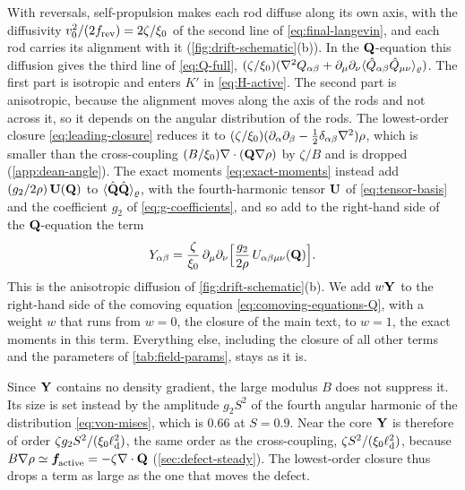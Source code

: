 \documentclass[aps,pre,reprint,superscriptaddress,longbibliography,nofootinbib
]{revtex4-2}
\begin{document}
With reversals, self-propulsion makes each rod diffuse
along its own axis, with the diffusivity
$v_0^2/(2f_{\rm rev})=2\zeta/\xi_0$ of the second line of
\cref{eq:final-langevin}, and each rod carries its
alignment with it (\cref{fig:drift-schematic}(b)). In the
$\mathbf{Q}$-equation this diffusion gives the third line of
\cref{eq:Q-full},
$(\zeta/\xi_0)(\nabla^2Q_{\alpha\beta}+\partial_\mu\partial_\nu\langle\hat
Q_{\alpha\beta}\hat Q_{\mu\nu}\rangle_\varrho)$. The first part is
isotropic and enters $K'$ in \cref{eq:H-active}. The second
part is anisotropic, because the alignment moves along the
axis of the rods and not across it, so it depends on the
angular distribution of the rods. The lowest-order closure
\cref{eq:leading-closure} reduces it to
$(\zeta/\xi_0)(\partial_\alpha\partial_\beta-\tfrac12\delta_{\alpha\beta}\nabla^2)\rho$,
which is smaller than the cross-coupling
$(B/\xi_0)\nabla\cdot(\mathbf{Q}\nabla\rho)$ by $\zeta/B$ and is
dropped (\cref{app:dean-angle}). The exact moments
\cref{eq:exact-moments} instead add $(g_2/2\rho)\,\mathbf{U}(\mathbf{Q})$
to $\langle\hat{\mathbf{Q}}\hat{\mathbf{Q}}\rangle_\varrho$, with the
fourth-harmonic tensor $\mathbf{U}$ of \cref{eq:tensor-basis} and
the coefficient $g_2$ of \cref{eq:g-coefficients}, and so
add to the right-hand side of the $\mathbf{Q}$-equation the term
\begin{equation}
  \label{eq:drift-U-term}
  Y_{\alpha\beta}=\frac{\zeta}{\xi_0}\,\partial_\mu\partial_\nu\Bigl[\frac{g_2}{2\rho}\,U_{{\alpha\beta} \mu\nu}(\mathbf{Q})\Bigr].
\end{equation}
This is the anisotropic diffusion of
\cref{fig:drift-schematic}(b). We add $w\mathbf{Y}$ to the
right-hand side of the comoving equation
\cref{eq:comoving-equations-Q}, with a weight $w$ that runs
from $w=0$, the closure of the main text, to $w=1$, the
exact moments in this term. Everything else, including the
closure of all other terms and the parameters of
\cref{tab:field-params}, stays as it is.

Since $\mathbf{Y}$ contains no density gradient, the large modulus
$B$ does not suppress it. Its size is set instead by the
amplitude $g_2S^2$ of the fourth angular harmonic of the
distribution \cref{eq:von-mises}, which is $0.66$ at
$S=0.9$. Near the core $\mathbf{Y}$ is therefore of order $\zeta
g_2S^2/(\xi_0\ell_{\rm d}^2)$, the same order as the
cross-coupling, $\zeta S^2/(\xi_0\ell_{\rm d}^2)$, because
$B\nabla\rho\simeq\boldsymbol{f}_\text{\!active}=-\zeta\nabla\cdot\mathbf{Q}$
(\cref{sec:defect-steady}). The lowest-order closure thus
drops a term as large as the one that moves the defect.
\end{document}
